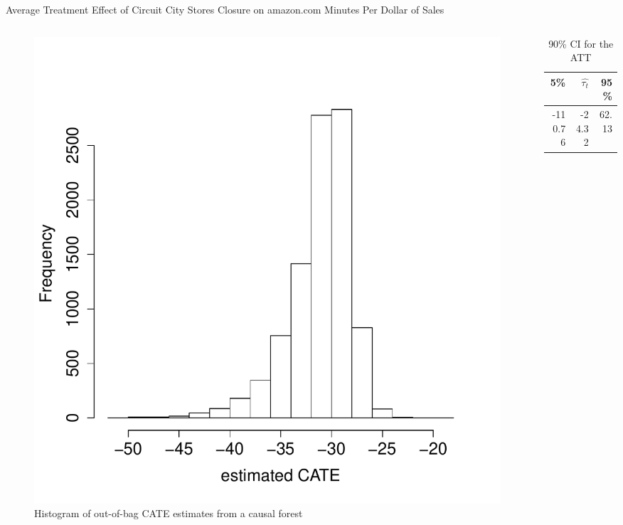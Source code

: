 \documentclass[mathserif, xcolor=table]{beamer}
\begin{document}
\begin{frame}{Average Treatment Effect of Circuit City Stores Closure on amazon.com Minutes Per Dollar of Sales}
	\vspace{-1em}
	\begin{columns}
		\begin{column}{.6\textwidth}
			\begin{figure}[h]
				\centering
				\includegraphics[scale=0.3]{pic/tauhat5_ama_hist.pdf}
				\caption{ Histogram of out-of-bag CATE estimates from a causal forest}
				\label{fig:tauhat5_ama_hist}
			\end{figure}
		\end{column}
		
		\begin{column}{.39\textwidth}
			\begin{table}[h]
				\caption{90\% CI for the ATT} 
				\centering
				\begin{tabular}{rrr}
					\hline
					5\%  & $\hat{\tau_t}$ & 95\% \\ 
					\hline
					-110.76 & -24.32 & 62.13 \\ 
					\hline
				\end{tabular}
			\end{table}
		\end{column}
	\end{columns}
\end{frame}
\end{document}
